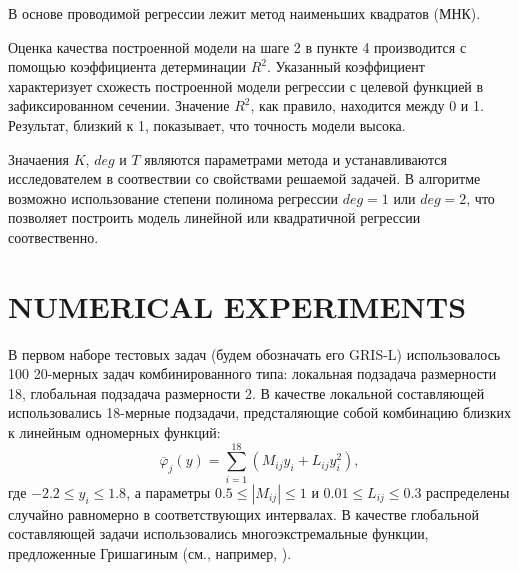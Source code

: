 \documentclass{aip-cp}
\begin{document}
В основе проводимой регрессии лежит метод наименьших квадратов (МНК).
%

Оценка качества построенной модели на шаге 2 в пункте 4 производится с помощью коэффициента детерминации $R^2$. Указанный коэффициент характеризует схожесть построенной модели регрессии с целевой функцией в зафиксированном сечении. Значение $R^2$, как правило, находится между 0 и 1. Результат, близкий к 1, показывает, что точность модели высока.

Значаения  $K$, $deg$ и $T$ являются параметрами метода и устанавливаются исследователем в соотвествии со свойствами решаемой задачей. В алгоритме возможно использование степени полинома регрессии $deg = 1$ или $deg = 2$, что позволяет построить модель линейной или квадратичной регрессии соотвественно.

\section{NUMERICAL EXPERIMENTS}

В первом наборе тестовых задач (будем обозначать его GRIS-L) использовалось 100 20-мерных задач комбинированного типа: локальная подзадача размерности 18, глобальная подзадача размерности 2. В качестве локальной составляющей использовались 18-мерные подзадачи, предсталяющие собой комбинацию близких к линейным одномерных функций:
\begin{equation}\label{X2_problem}
\overline{\varphi}_j(y) = \sum_{i=1}^{18} \left(M_{ij} y_i + L_{ij} y_i^2\right) ,
\end{equation}
где $-2.2 \leq y_i \leq 1.8$, а параметры $0.5 \leq |M_{ij}| \leq 1$ и $0.01 \leq L_{ij} \leq 0.3$  распределены случайно равномерно в соответствующих интервалах.
В качестве глобальной составляющей задачи использовались многоэкстремальные функции, предложенные Гришагиным (см., например, \cite{Grishagin1994}).
\end{document}
